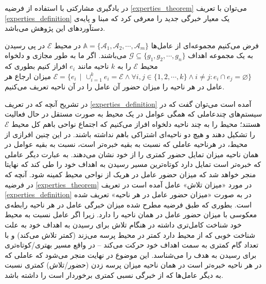 در یادگیری مشارکتی با استفاده از فرضیه
\ref{experties_theorem}
می‌توان با تعریف
\ref{experties_definition}
یک معیار خبرگی جدید را معرفی کرد که مبنا و پایه‌ی دستآوردهای این پژوهش می‌باشد.

\begin{definition}\setstretch{\thebaselinestretch}\label{experties_definition}
فرض می‌کنیم مجموعه‌ای از عامل‌ها
$\mathbb{A} = \{\mathcal{A}_1, \mathcal{A}_2, \cdots, \mathcal{A}_m\}$
در محیط $\mathcal{E}$ در پی رسیدن به یک مجموعه اهداف
$\mathcal{G} \subseteq \{g_1, g_2, \cdots, g_n\}$
می‌باشند. اگر ما به طور مجازی و دلخواه محیط $\mathcal{E}$ را به $k$ ناحیه‌ مانند $e_i$ افراز کنیم بطوری که
$\mathcal{E} = \{e_i \hspace{5pt}|\hspace{5pt} \cup_{i=1}^{k} e_i = \mathcal{E} \land \forall i,j\in\{1,2,\cdots,k\} \land i \neq j : e_i \cap e_j = \varnothing\}$
میزان ارجاع هر عامل در هر ناحیه را میزان حضور آن عامل را در آن ناحیه تعریف می‌کنیم.
\end{definition}

در تشریح آنچه که در تعریف
\ref{experties_definition}
آمده است می‌توان گفت که در سیستم‌های چندعاملی که همگی عوامل در یک محیط به صورت مستقل در حال فعالیت هستند؛ محیط را به چند ناحیه دلخواه افراز می‌کنیم که اجتماع نواحی باهم کل محیط $\mathcal{E}$ را تشکیل دهند و هیچ دو ناحیه‌ای اشتراکی باهم نداشته باشند. در این چنین افرازی از محیط، در هرناحیه عاملی که نسبت به بقیه خبره‌تر است، نسبت به بقیه عوامل در همان ناحیه میزان تمایل حضور کمتری را از خود نشان می‌دهند. به عبارت دیگر عاملی که خبره‌تر است تمایل دارد کوتاه‌ترین مسیر رسیدن به اهداف خود را طی کند که نهایتا منجر خواهد شد که میزان حضور عامل در هریک از نواحی محیط کمینه شود.
آنچه که در فرضیه
\ref{experties_theorem}
در مورد «میزان تلاش» عامل آمده است در تعریف
\ref{experties_definition}
در به صورت «میزان حضور عامل در هر ناحیه» تعریف شده است. بطوری که طبق فرضیه مطرح شده میزان خبرگی عامل در هر ناحیه رابطه‌ی معکوسی با میزان حضور عامل در همان ناحیه را دارد. زیرا اگر عامل نسبت به محیط خود شناخت کامل‌تری داشته در هنگام تلاش برای رسیدن به اهداف خود به علت شناخت خوبی که از محیط دارد کمتر در محیط پرسه می‌زند (کمتر تلاش می‌کند) و با تعداد گام کمتری به سمت اهداف خود حرکت می‌کند -- در واقع مسیر بهتری/کوتاه‌تری برای رسیدن به هدف را می‌شناسد. این موضوع در نهایت منجر می‌شود که عاملی که در هر ناحیه خبره‌تر است در همان ناحیه میزان پرسه زدن (حضور/تلاش) کمتری نسبت به دیگر عامل‌ها که از خبرگی نسبی کمتری برخوردار است را داشته باشد.


